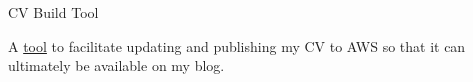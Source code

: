 \cventry
    {CV Build Tool} %
    {} %
    {} %
    {} %
    {\begin{cvitems}
         \item{A \href{https://github.com/bogdan23a/cv}{tool} to facilitate updating and publishing my CV to AWS so that it can ultimately be available on my blog.}
    \end{cvitems}}